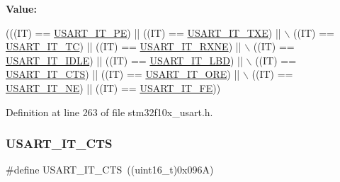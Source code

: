 {\bfseries Value\+:}
\begin{DoxyCode}
(((IT) == \hyperlink{group___u_s_a_r_t___interrupt__definition_gae607c28a462c224c575b7541dc4f7067}{USART\_IT\_PE}) || ((IT) == \hyperlink{group___u_s_a_r_t___interrupt__definition_gab18d0fe889204a4c34f6d5817fb5147d}{USART\_IT\_TXE}) || \(\backslash\)
                            ((IT) == \hyperlink{group___u_s_a_r_t___interrupt__definition_ga748e86162cc110513330079982821c39}{USART\_IT\_TC}) || ((IT) == 
      \hyperlink{group___u_s_a_r_t___interrupt__definition_gacdd49b93072655a21a63a35e6431f8ae}{USART\_IT\_RXNE}) || \(\backslash\)
                            ((IT) == \hyperlink{group___u_s_a_r_t___interrupt__definition_ga5d85aab24b7b2dfddb61ba2a49fa6185}{USART\_IT\_IDLE}) || ((IT) == 
      \hyperlink{group___u_s_a_r_t___interrupt__definition_ga063628e16cdda199b07d380421afc4a5}{USART\_IT\_LBD}) || \(\backslash\)
                            ((IT) == \hyperlink{group___u_s_a_r_t___interrupt__definition_gab49efbefaca2921e8cbe8f5146e99dbd}{USART\_IT\_CTS}) || ((IT) == 
      \hyperlink{group___u_s_a_r_t___interrupt__definition_ga8b7d40e02a81be787fbb325bbe6dfbeb}{USART\_IT\_ORE}) || \(\backslash\)
                            ((IT) == \hyperlink{group___u_s_a_r_t___interrupt__definition_gad5de042f579b50f1e8643009176486b3}{USART\_IT\_NE}) || ((IT) == 
      \hyperlink{group___u_s_a_r_t___interrupt__definition_ga9af8790f78f6cb1591506c57d0cc0fb3}{USART\_IT\_FE}))
\end{DoxyCode}


Definition at line 263 of file stm32f10x\+\_\+usart.\+h.

\mbox{\label{group___u_s_a_r_t___interrupt__definition_gab49efbefaca2921e8cbe8f5146e99dbd}} 
\subsubsection{\texorpdfstring{U\+S\+A\+R\+T\+\_\+\+I\+T\+\_\+\+C\+TS}{USART\_IT\_CTS}}
{\footnotesize\ttfamily \#define U\+S\+A\+R\+T\+\_\+\+I\+T\+\_\+\+C\+TS~((uint16\+\_\+t)0x096\+A)}



